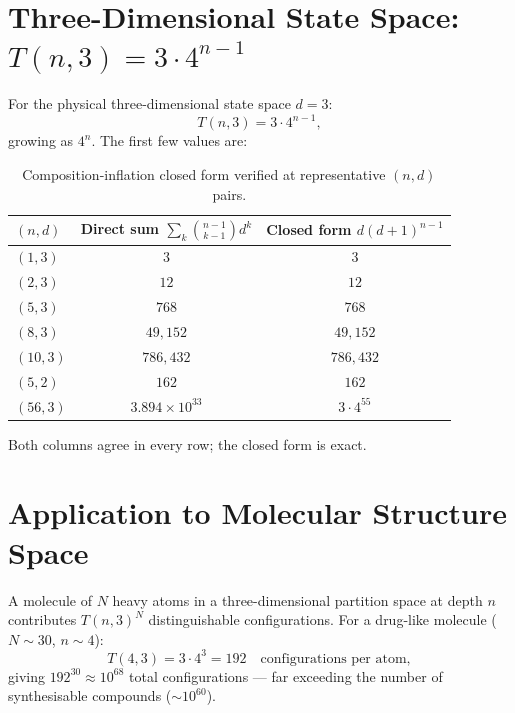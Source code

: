 \section{Three-Dimensional State Space: $T(n,3) = 3\cdot 4^{n-1}$}
\label{sec:ch19-d3}

For the physical three-dimensional state space $d = 3$:
\begin{equation}
  T(n,3) = 3\cdot 4^{n-1},
\end{equation}
growing as $4^{n}$.
The first few values are:

\begin{table}[H]
\centering\small
\caption{Composition-inflation closed form verified at representative $(n,d)$ pairs.}
\label{tab:compositionspotcheck}
\begin{tabular}{lcc}
\toprule
$(n,d)$ & Direct sum $\sum_{k}\binom{n-1}{k-1}d^{k}$ & Closed form $d(d+1)^{n-1}$\\
\midrule
$(1,3)$  & $3$               & $3$\\
$(2,3)$  & $12$              & $12$\\
$(5,3)$  & $768$             & $768$\\
$(8,3)$  & $49{,}152$        & $49{,}152$\\
$(10,3)$ & $786{,}432$       & $786{,}432$\\
$(5,2)$  & $162$             & $162$\\
$(56,3)$ & $3.894\times10^{33}$ & $3\cdot 4^{55}$\\
\bottomrule
\end{tabular}
\end{table}

\noindent
Both columns agree in every row; the closed form is exact.

\section{Application to Molecular Structure Space}
\label{sec:ch19-molecular}

A molecule of $N$ heavy atoms in a three-dimensional partition space at depth
$n$ contributes $T(n,3)^{N}$ distinguishable configurations.
For a drug-like molecule ($N \sim 30$, $n \sim 4$):
\begin{equation}
  T(4,3) = 3\cdot 4^{3} = 192 \quad\text{configurations per atom},
\end{equation}
giving $192^{30} \approx 10^{68}$ total configurations --- far exceeding the
number of synthesisable compounds ($\sim 10^{60}$).


